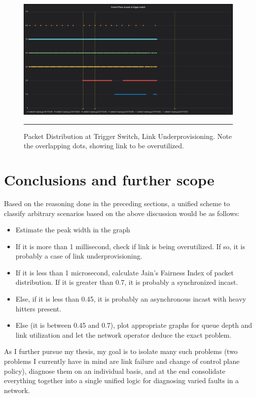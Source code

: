 \begin{figure}[htbp]
	\centering
		\includegraphics[width=1.0\columnwidth]{Figures/distribution_under.png}
		\rule{35em}{0.5pt}
	\caption[Packet Distribution at Trigger Switch, Link Underprovisioning]{Packet Distribution at Trigger Switch, Link Underprovisioning. Note the overlapping dots, showing link to be overutilized.}
	\label{fig:distribution_under}
\end{figure}
\section{Conclusions and further scope}

Based on the reasoning done in the preceding sections, a unified scheme to classify arbitrary scenarios based on the above discussion would be as follows:
\begin{itemize}
	\item Estimate the peak width in the graph
	\item If it is more than 1 millisecond, check if link is being overutilized. If so, it is probably a case of link underprovisioning.
	\item If it is less than 1 microsecond, calculate Jain's Fairness Index of packet distribution. If it is greater than 0.7, it is probably a synchronized incast. 
	\item Else, if it is less than 0.45, it is probably an asynchronous incast with heavy hitters present.
	\item Else (it is between 0.45 and 0.7), plot appropriate graphs for queue depth and link utilization and let the network operator deduce the exact problem.
\end{itemize}

As I further pursue my thesis, my goal is to isolate many such problems (two problems I currently have in mind are link failure 
and change of control plane policy), diagnose them on an individual basis, and at the end consolidate everything together into a single unified logic for diagnosing 
varied faults in a network.

